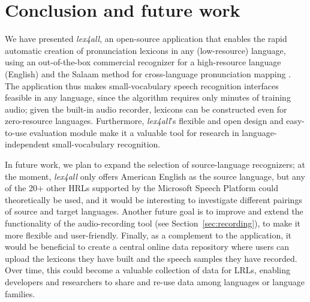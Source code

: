\documentclass[11pt]{article}
\begin{document}
\section{Conclusion and future work}
\label{sec:future}

We have presented \textit{lex4all}, an open-source application that enables the rapid automatic creation of pronunciation lexicons in any (low-resource) language, using an out-of-the-box commercial recognizer \cite{mspsdk} for a high-resource language (English) and the Salaam method for cross-language pronunciation mapping \cite{Qiao10,Chan12}. The application thus makes small-vocabulary speech recognition interfaces feasible in any language, since the algorithm requires only minutes of training audio; given the built-in audio recorder, lexicons can be constructed even for zero-resource languages. 
Furthermore, \textit{lex4all}'s flexible and open design and easy-to-use evaluation module
make it a valuable tool for
research in language-independent small-vocabulary recognition.

In future work, we plan 
to expand the selection of source-language recognizers; at the moment, \textit{lex4all} only offers American English as the source language, but any of the 20+ other HRLs supported by the Microsoft Speech Platform could theoretically be used, and it would be interesting to investigate different pairings of source and target languages. Another future goal is to improve and extend the functionality of the audio-recording tool (see Section~\ref{sec:recording}), 
to make it more flexible and user-friendly.
Finally, as a complement to the application, it would be beneficial to 
create a central online data repository where users can 
upload the lexicons they have built and the speech samples they have recorded. %
Over time, this could become a valuable collection of data for LRLs, enabling developers and researchers to share and re-use data among languages or language families.
\end{document}
